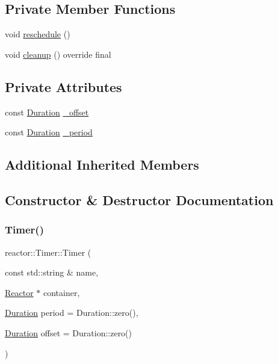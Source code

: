 \subsection*{Private Member Functions}
\begin{DoxyCompactItemize}
\item 
void \hyperlink{classreactor_1_1Timer_a24cde6fc75c1098f9941ce80a5b7f814}{reschedule} ()
\item 
void \hyperlink{classreactor_1_1Timer_ab01356b0c99de6a3bd9f46bfd0ce1c7b}{cleanup} () override final
\end{DoxyCompactItemize}
\subsection*{Private Attributes}
\begin{DoxyCompactItemize}
\item 
const \hyperlink{namespacereactor_aa8375b807a80703545664096c5b5b779}{Duration} \hyperlink{classreactor_1_1Timer_ae3f332ade1a8caf90db054024dcf931b}{\+\_\+offset}
\item 
const \hyperlink{namespacereactor_aa8375b807a80703545664096c5b5b779}{Duration} \hyperlink{classreactor_1_1Timer_a3524de2cc02985e98ee7115300adc452}{\+\_\+period}
\end{DoxyCompactItemize}
\subsection*{Additional Inherited Members}


\subsection{Constructor \& Destructor Documentation}
\mbox{\label{classreactor_1_1Timer_a54e32e02f2374d4cb4097618cb6181a2}} 
\subsubsection{\texorpdfstring{Timer()}{Timer()}}
{\footnotesize\ttfamily reactor\+::\+Timer\+::\+Timer (\begin{DoxyParamCaption}\item[{const std\+::string \&}]{name,  }\item[{\hyperlink{classreactor_1_1Reactor}{Reactor} $\ast$}]{container,  }\item[{\hyperlink{namespacereactor_aa8375b807a80703545664096c5b5b779}{Duration}}]{period = {\ttfamily Duration\+:\+:zero()},  }\item[{\hyperlink{namespacereactor_aa8375b807a80703545664096c5b5b779}{Duration}}]{offset = {\ttfamily Duration\+:\+:zero()} }\end{DoxyParamCaption})\hspace{0.3cm}{\ttfamily [inline]}}



